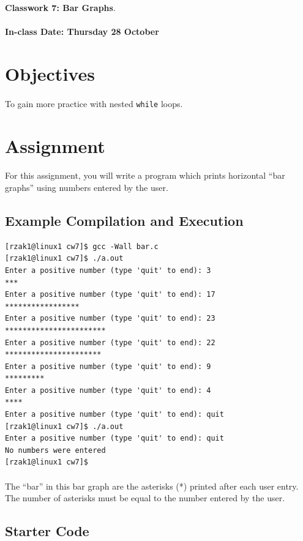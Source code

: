 \documentclass[letter,11pt]{article}
\begin{document}
\huge
\textbf{Classwork 7: Bar Graphs}.
\normalsize
\\ ~~ \\
\textbf{In-class Date: Thursday 28 October}

\section*{Objectives}
\paragraph{}To gain more practice with nested \texttt{while} loops.

\section*{Assignment}
\paragraph{}For this assignment, you will write a program which prints horizontal ``bar graphs'' using numbers entered by the user.

\subsection*{Example Compilation and Execution}
\begin{verbatim}
[rzak1@linux1 cw7]$ gcc -Wall bar.c
[rzak1@linux1 cw7]$ ./a.out
Enter a positive number (type 'quit' to end): 3
***
Enter a positive number (type 'quit' to end): 17
*****************
Enter a positive number (type 'quit' to end): 23
***********************
Enter a positive number (type 'quit' to end): 22
**********************
Enter a positive number (type 'quit' to end): 9
*********
Enter a positive number (type 'quit' to end): 4
****
Enter a positive number (type 'quit' to end): quit
[rzak1@linux1 cw7]$ ./a.out
Enter a positive number (type 'quit' to end): quit
No numbers were entered
[rzak1@linux1 cw7]$
\end{verbatim}

\paragraph{}The ``bar'' in this bar graph are the asterisks (*) printed after each user entry. The number of asterisks must be equal to the number entered by the user.

\subsection*{Starter Code}
\end{document}

